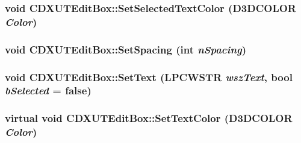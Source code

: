 \label{class_c_d_x_u_t_edit_box_ae43b2c8142d3ce9602ae73193b0982fe}
\hypertarget{class_c_d_x_u_t_edit_box_a44d55aa688bac6e18ea8b86f8707b9b8}{
\subsubsection[{SetSelectedTextColor}]{\setlength{\rightskip}{0pt plus 5cm}void CDXUTEditBox::SetSelectedTextColor (D3DCOLOR {\em Color})}}
\label{class_c_d_x_u_t_edit_box_a44d55aa688bac6e18ea8b86f8707b9b8}
\hypertarget{class_c_d_x_u_t_edit_box_ada1e5253fd1df390a9536cd111ed0121}{
\subsubsection[{SetSpacing}]{\setlength{\rightskip}{0pt plus 5cm}void CDXUTEditBox::SetSpacing ({\bf int} {\em nSpacing})}}
\label{class_c_d_x_u_t_edit_box_ada1e5253fd1df390a9536cd111ed0121}
\hypertarget{class_c_d_x_u_t_edit_box_a3ef3e3ef8a085258ba6bb69285505924}{
\subsubsection[{SetText}]{\setlength{\rightskip}{0pt plus 5cm}void CDXUTEditBox::SetText (LPCWSTR {\em wszText}, \/  bool {\em bSelected} = {\ttfamily false})}}
\label{class_c_d_x_u_t_edit_box_a3ef3e3ef8a085258ba6bb69285505924}
\hypertarget{class_c_d_x_u_t_edit_box_a7240aa451e6662077671f754f331edfa}{
\subsubsection[{SetTextColor}]{\setlength{\rightskip}{0pt plus 5cm}virtual void CDXUTEditBox::SetTextColor (D3DCOLOR {\em Color})}}
\label{class_c_d_x_u_t_edit_box_a7240aa451e6662077671f754f331edfa}


